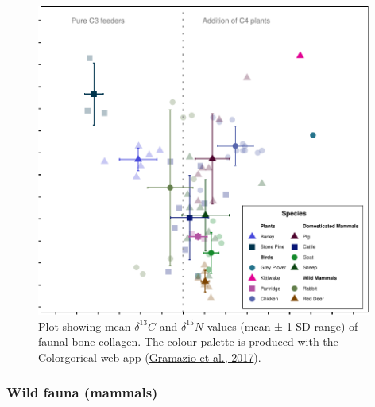 \documentclass[preprint, 3p, authoryear]{elsarticle} %
\begin{document}
\begin{figure}
\includegraphics[width=0.98\textwidth]{RPaladuguetal_Castro_files/figure-latex/fauna-carbnitro-iso-plot-1} \caption{Plot showing mean \(\delta ^{13}C\) and \(\delta ^{15}N\) values (mean ± 1 SD range) of faunal bone collagen. The colour palette is produced with the Colorgorical web app (\protect\hyperlink{ref-gramazio_etal17}{Gramazio et al., 2017}).}\label{fig:fauna-carbnitro-iso-plot}
\end{figure}

\hypertarget{wild-fauna-mammals}{%
\subsubsection{Wild fauna (mammals)}\label{wild-fauna-mammals}}
\end{document}

